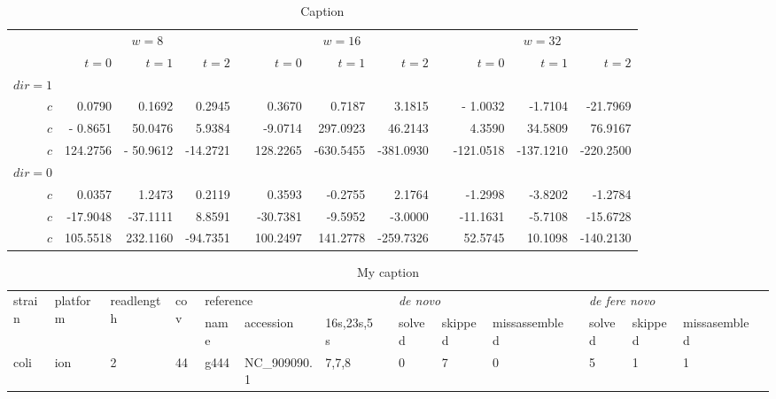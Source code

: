 \documentclass[11pt]{article}
\newcommand{\ra}[1]{\renewcommand{\arraystretch}{#1}}
\begin{document}
\begin{table}
\centering
\ra{1.3}
\begin{tabular}{@{}rrrrcrrrcrrr@{}}\toprule &
\multicolumn{3}{c}{$w = 8$} & \phantom{abc} & \multicolumn{3}{c}{$w = 16$} & \phantom{abc} & \multicolumn{3}{c}{$w = 32$} \\
  \cmidrule{2-4} \cmidrule{6-8} \cmidrule{10-12} &
 $t=0$ & $t=1$ & $t=2$ && $t=0$ & $t=1$ & $t=2$ && $t=0$ & $t=1$ & $t=2$\\
\midrule
$dir=1$ \\
$c$ & 0.0790 & 0.1692 & 0.2945 && 0.3670 & 0.7187 & 3.1815 && - 1.0032 & -1.7104 & -21.7969 \\
$c$ &  - 0.8651  & 50.0476& 5.9384 & & -9.0714& 297.0923& 46.2143&& 4.3590& 34.5809& 76.9167 \\
$c$ & 124.2756& - 50.9612& -14.2721&& 128.2265& -630.5455& -381.0930&& -121.0518& -137.1210& -220.2500 \\
$dir=0$ \\
$c$ & 0.0357& 1.2473& 0.2119&& 0.3593& -0.2755& 2.1764&& -1.2998& -3.8202& -1.2784 \\
$c$ & -17.9048& -37.1111& 8.8591&& -30.7381& -9.5952& -3.0000&& -11.1631& -5.7108& -15.6728 \\
$c$ & 105.5518& 232.1160&
-94.7351&& 100.2497& 141.2778& -259.7326&& 52.5745& 10.1098& -140.2130\\
\bottomrule
\end{tabular}
\caption{Caption}
\end{table}

\begin{table}[]
\centering
\caption{My caption}
\label{my-label}
\begin{tabular}{llllllllllllllll}
  \hline
\multirow{2}{*}{strain} & \multirow{2}{*}{platform} & \multirow{2}{*}{readlength} & \multirow{2}{*}{cov} & \multicolumn{3}{l}{reference} &  & \multicolumn{3}{l}{\textit{de novo}} &  & \multicolumn{3}{l}{\textit{de fere novo}} &  \\ \cline{5-7} \cline{9-11} \cline{13-15}
 &  &  &  & name & accession & 16s,23s,5s &  & solved & skipped & missassembled &  & solved & skipped & missasembled &  \\
  \hline
  coli & ion & 2 & 44 & g444 & NC\_909090.1 & 7,7,8 &  & 0 & 7 & 0 &  & 5 & 1 & 1 &
\end{tabular}
\end{table}
\end{document}
